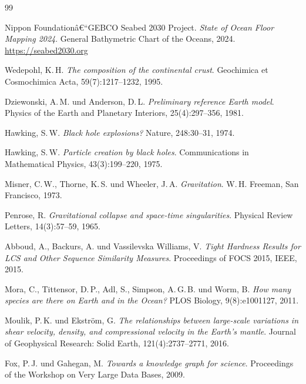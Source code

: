 ﻿\documentclass[a4paper,12pt]{article}
\theoremstyle{definition}
\begin{document}
\newpage
\begin{thebibliography}{99}

Nippon Foundationâ€“GEBCO Seabed 2030 Project.
\textit{State of Ocean Floor Mapping 2024}.
General Bathymetric Chart of the Oceans, 2024.
\url{https://seabed2030.org}

Wedepohl, K.\,H.
\textit{The composition of the continental crust}.
Geochimica et Cosmochimica Acta, 59(7):1217--1232, 1995.

Dziewonski, A.\,M. und Anderson, D.\,L.
\textit{Preliminary reference Earth model}.
Physics of the Earth and Planetary Interiors, 25(4):297--356, 1981.

Hawking, S.\,W.
\textit{Black hole explosions?}
Nature, 248:30--31, 1974.

Hawking, S.\,W.
\textit{Particle creation by black holes}.
Communications in Mathematical Physics, 43(3):199--220, 1975.

Misner, C.\,W., Thorne, K.\,S. und Wheeler, J.\,A.
\textit{Gravitation}.
W.\,H. Freeman, San Francisco, 1973.

Penrose, R.
\textit{Gravitational collapse and space-time singularities}.
Physical Review Letters, 14(3):57--59, 1965.

Abboud, A., Backurs, A. und Vassilevska Williams, V.
\textit{Tight Hardness Results for LCS and Other Sequence Similarity Measures}.
Proceedings of FOCS 2015, IEEE, 2015.

Mora, C., Tittensor, D.\,P., Adl, S., Simpson, A.\,G.\,B. und Worm, B.
\textit{How many species are there on Earth and in the Ocean?}
PLOS Biology, 9(8):e1001127, 2011.

Moulik, P.\,K. und Ekström, G.
\textit{The relationships between large-scale variations in shear velocity,
density, and compressional velocity in the Earth's mantle}.
Journal of Geophysical Research: Solid Earth, 121(4):2737--2771, 2016.

Fox, P.\,J. und Gahegan, M.
\textit{Towards a knowledge graph for science}.
Proceedings of the Workshop on Very Large Data Bases, 2009.


\end{thebibliography}
\end{document}
